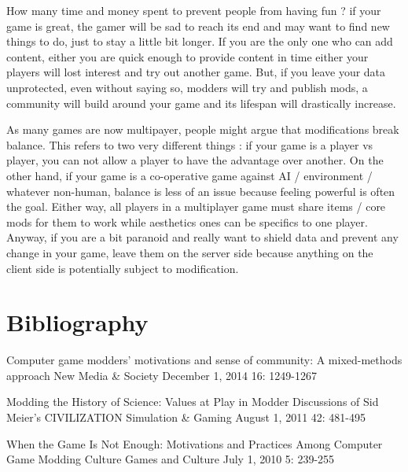 \documentclass[a4paper,12pt]{article}
\begin{document}
How many time and money spent to prevent people from having fun ? if your game is great, the gamer will be sad to reach its end and may want to find new things to do, just to stay a little bit longer. If you are the only one who can add content, either you are quick enough to provide content in time either your players will lost interest and try out another game. But, if you leave your data unprotected, even without saying so, modders will try and publish mods, a community will build around your game and its lifespan will drastically increase.

As many games are now multipayer, people might argue that modifications break balance. This refers to two very different things : if your game is a player vs player, you can not allow a player to have the advantage over another. On the other hand, if your game is a co-operative game against  AI / environment / whatever non-human, balance is less of an issue because feeling powerful is often the goal. Either way, all players in a multiplayer game must share items / core mods for them to work while aesthetics ones can be specifics to one player. Anyway, if you are a bit paranoid and really want to shield data and prevent any change in your game, leave them on the server side because anything on the client side is potentially subject to modification.



\newpage
\tableofcontents
\newpage

\section{Bibliography}
Computer game modders' motivations and sense of community: A mixed-methods approach New Media \& Society December 1, 2014 16: 1249-1267

Modding the History of Science: Values at Play in Modder Discussions of Sid Meier's CIVILIZATION Simulation \& Gaming August 1, 2011 42: 481-495

When the Game Is Not Enough: Motivations and Practices Among Computer Game Modding Culture Games and Culture July 1, 2010 5: 239-255
\end{document}
